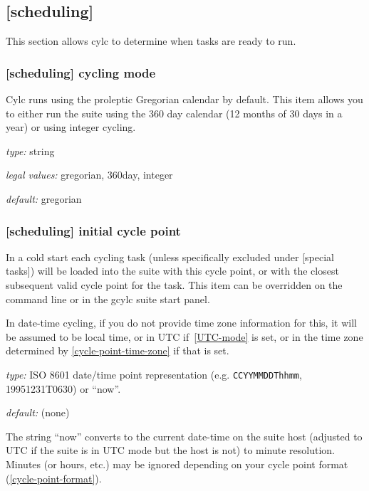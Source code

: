 \subsection{[scheduling]}

This section allows cylc to determine when tasks are ready to run.

\subsubsection[cycling]{ [scheduling] \textrightarrow cycling mode }
\label{cycling-mode}

Cylc runs using the proleptic Gregorian calendar by default. This item allows
you to either run the suite using the 360 day calendar (12 months of 30 days
in a year) or using integer cycling.

\begin{myitemize}
    \item {\em type:} string
    \item {\em legal values:} gregorian, 360day, integer
    \item {\em default:} gregorian

\end{myitemize}

\subsubsection[initial cycle point]{[scheduling] \textrightarrow initial cycle point}
\label{initial cycle point}

In a cold start each cycling task (unless specifically excluded under
[special tasks]) will be loaded into the suite with this cycle point,
or with the closest subsequent valid cycle point for the task.  This item can
be overridden on the command line or in the gcylc suite start panel.

In date-time cycling, if you do not provide time zone information for this,
it will be assumed to be local time, or in UTC if~\ref{UTC-mode} is set, or in
the time zone determined by \ref{cycle-point-time-zone} if that is set.

\begin{myitemize}
    \item {\em type:} ISO 8601 date/time point representation (e.g.
 \lstinline=CCYYMMDDThhmm=, 19951231T0630) or ``now''.
    \item {\em default:} (none)
\end{myitemize}

The string ``now'' converts to the current date-time on the suite host (adjusted
to UTC if the suite is in UTC mode but the host is not) to minute resolution.
Minutes (or hours, etc.) may be ignored depending on your cycle point format
(\ref{cycle-point-format}).

